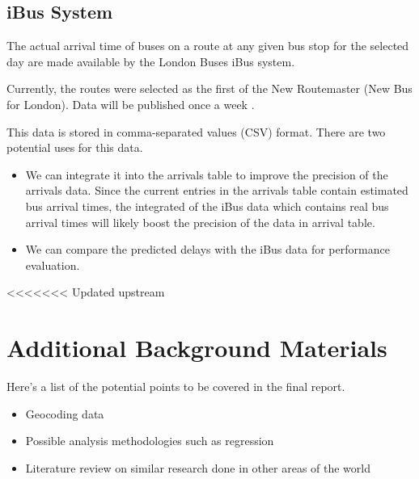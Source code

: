 \subsection{iBus System}
The actual arrival time of buses on a route at any given bus stop for the selected day are made available by the London Buses iBus system.

Currently, the routes were selected as the first of the New Routemaster (New Bus for London). Data will be published once a week \cite{buses_performance_data}.

This data is stored in comma-separated values (CSV) format. There are two potential uses for this data.
\begin{itemize}
	\item We can integrate it into the arrivals table to improve the precision of the arrivals data. Since the current entries in the arrivals table contain estimated bus arrival times, the integrated of the iBus data which contains real bus arrival times will likely boost the precision of the data in arrival table.
	\item We can compare the predicted delays with the iBus data for performance evaluation.
\end{itemize}
<<<<<<< Updated upstream

\section{Additional Background Materials}
Here's a list of the potential points to be covered in the final report.

\begin{itemize}
	\item Geocoding data
    \item Possible analysis methodologies such as regression
    \item Literature review on similar research done in other areas of the world
\end{itemize}




